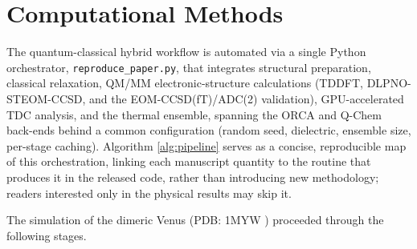 \documentclass[journal=jpcbfk, manuscript=article, layout=twocolumn, doi=true]{achemso}
\begin{document}
\clearpage
\section{Computational Methods}

The quantum-classical hybrid workflow is automated via a single Python orchestrator, \texttt{reproduce\_paper.py}, that integrates structural preparation, classical relaxation, QM/MM electronic-structure calculations (TDDFT, DLPNO-STEOM-CCSD, and the EOM-CCSD(fT)/ADC(2) validation), GPU-accelerated TDC analysis, and the thermal ensemble, spanning the ORCA and Q-Chem back-ends behind a common configuration (random seed, dielectric, ensemble size, per-stage caching). Algorithm \ref{alg:pipeline} serves as a concise, reproducible map of this orchestration, linking each manuscript quantity to the routine that produces it in the released code, rather than introducing new methodology; readers interested only in the physical results may skip it.

The simulation of the dimeric Venus (PDB: 1MYW \cite{berman2000protein}) proceeded through the following stages.
\end{document}
